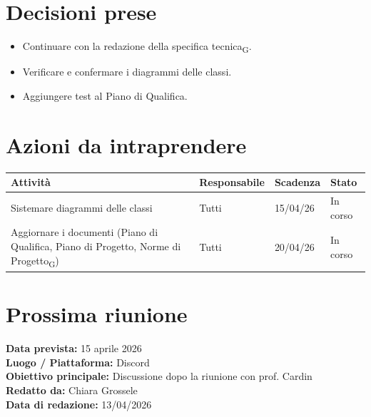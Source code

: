 \documentclass[a4paper,12pt]{article}
\newcommand{\gls}[1]{#1\textsubscript{G}}
\begin{document}
\section*{Decisioni prese}
\begin{itemize}
    \item Continuare con la redazione della \gls{specifica tecnica}.
    \item Verificare e confermare i diagrammi delle classi.
    \item Aggiungere test al Piano di Qualifica.
\end{itemize}

\section*{Azioni da intraprendere}
\begin{longtable}{|p{}|p{}|p{}|p{}|}
\hline
\textbf{Attività} & \textbf{Responsabile} & \textbf{Scadenza} & \textbf{Stato} \\ \hline
Sistemare diagrammi delle classi & Tutti & 15/04/26 & In corso \\ \hline
Aggiornare i documenti (Piano di Qualifica, Piano di Progetto, \gls{Norme di Progetto})& Tutti & 20/04/26 & In corso \\ \hline
\end{longtable}

\section*{Prossima riunione}
\textbf{Data prevista:} 15 aprile 2026\\
\textbf{Luogo / Piattaforma:} Discord \\
\textbf{Obiettivo principale:} Discussione dopo la riunione con prof. Cardin\\

\textbf{Redatto da:} Chiara Grossele \\
\textbf{Data di redazione:} 13/04/2026
\end{document}
